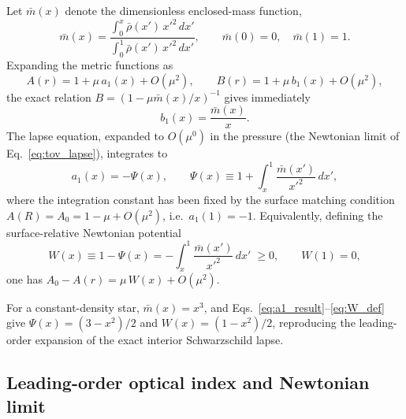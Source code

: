\documentclass[
  aps,
  prd,
  twocolumn,
  nofootinbib,
  superscriptaddress,
  longbibliography
]{revtex4-2}
\begin{document}
Let $\bar m(x)$ denote the dimensionless enclosed-mass function,
\begin{equation}
\bar m(x)
=
\frac{\displaystyle\int_0^x \bar\rho(x')\,x'^2\,dx'}
     {\displaystyle\int_0^1 \bar\rho(x')\,x'^2\,dx'},
\qquad
\bar m(0)=0,\quad \bar m(1)=1.
\label{eq:mbar_def}
\end{equation}
Expanding the metric functions as
\begin{equation}
A(r)=1+\mu\,a_1(x)+O(\mu^2),
\qquad
B(r)=1+\mu\,b_1(x)+O(\mu^2),
\label{eq:AB_expansion}
\end{equation}
the exact relation $B=(1-\mu\bar m(x)/x)^{-1}$ gives immediately
\begin{equation}
b_1(x)=\frac{\bar m(x)}{x}.
\label{eq:b1_result}
\end{equation}
The lapse equation, expanded to $O(\mu^0)$ in the pressure (the
Newtonian limit of Eq.~\eqref{eq:tov_lapse}), integrates to
\begin{equation}
a_1(x)=-\Psi(x),
\qquad
\Psi(x)\equiv 1+\int_x^1\frac{\bar m(x')}{x'^2}\,dx',
\label{eq:a1_result}
\end{equation}
where the integration constant has been fixed by the surface matching
condition $A(R)=A_0=1-\mu+O(\mu^2)$, i.e.\ $a_1(1)=-1$. Equivalently,
defining the surface-relative Newtonian potential
\begin{equation}
W(x)\equiv 1-\Psi(x)=-\int_x^1\frac{\bar m(x')}{x'^2}\,dx'\;\geq 0,
\qquad W(1)=0,
\label{eq:W_def}
\end{equation}
one has $A_0-A(r)=\mu\,W(x)+O(\mu^2)$.

For a constant-density star, $\bar m(x)=x^3$, and
Eqs.~\eqref{eq:a1_result}--\eqref{eq:W_def} give
$\Psi(x)=(3-x^2)/2$ and $W(x)=(1-x^2)/2$, reproducing the leading-order
expansion of the exact interior Schwarzschild lapse.

\subsection{Leading-order optical index and Newtonian limit}
\end{document}
